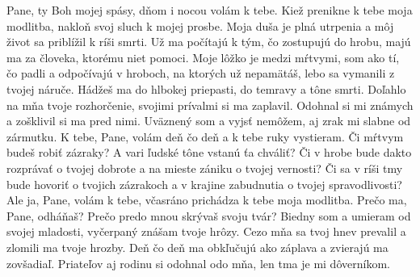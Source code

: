 Pane, ty Boh mojej spásy,
dňom i nocou volám k tebe.
\versseparator
Kiež prenikne k tebe moja modlitba,
nakloň svoj sluch k mojej prosbe.
\versseparator
Moja duša je plná utrpenia
a môj život sa priblížil k ríši smrti.
\versseparator
Už ma počítajú k tým, čo zostupujú do hrobu,
majú ma za človeka, ktorému niet pomoci.
\versseparator
Moje lôžko je medzi mŕtvymi,
som ako tí, čo padli a odpočívajú v hroboch,
\versseparator
na ktorých už nepamätáš,
lebo sa vymanili z tvojej náruče.
\versseparator
Hádžeš ma do hlbokej priepasti,
do temravy a tône smrti.
\versseparator
Doľahlo na mňa tvoje rozhorčenie,
svojimi prívalmi si ma zaplavil.
\versseparator
Odohnal si mi známych
a zošklivil si ma pred nimi.
\versseparator
Uväznený som a vyjsť nemôžem,
aj zrak mi slabne od zármutku.
\versseparator
K tebe, Pane, volám deň čo deň
a k tebe ruky vystieram.
\versseparator
Či mŕtvym budeš robiť zázraky?
A vari ľudské tône vstanú ťa chváliť?
\versseparator
Či v hrobe bude dakto rozprávať o tvojej dobrote
a na mieste zániku o tvojej vernosti?
\versseparator
Či sa v ríši tmy bude hovoriť o tvojich zázrakoch
a v krajine zabudnutia o tvojej spravodlivosti?
\versseparator
Ale ja, Pane, volám k tebe,
včasráno prichádza k tebe moja modlitba.
\versseparator
Prečo ma, Pane, odháňaš?
Prečo predo mnou skrývaš svoju tvár?
\versseparator
Biedny som a umieram od svojej mladosti,
vyčerpaný znášam tvoje hrôzy.
\versseparator
Cezo mňa sa tvoj hnev prevalil
a zlomili ma tvoje hrozby.
\versseparator
Deň čo deň ma obkľučujú ako záplava
a zvierajú ma zovšadiaľ.
\versseparator
Priateľov aj rodinu si odohnal odo mňa,
len tma je mi dôverníkom.